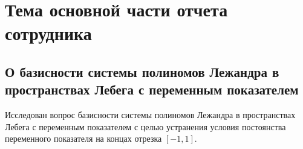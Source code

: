 \chapter{Тема основной части отчета сотрудника}


%


%
%


\section{О базисности системы полиномов Лежандра в пространствах Лебега с переменным показателем}

Исследован вопрос базисности системы полиномов Лежандра в пространствах Лебега с переменным показателем с целью устранения условия постоянства переменного показателя на концах отрезка $[-1,1]$.


